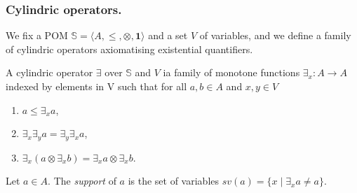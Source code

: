 \documentclass{llncs}
\newcommand{\comment}[1]{}
\def\monid{{\mathbf 0}}
\def\monop{\otimes}
\def\monid{\mathbf{1}}
\begin{document}
\comment{\smallskip
Our first step is the introduction of a technical notion that allows for 
factorising the common properties in the definition of the two families of operators.

\begin{definition}[pomonoid action]
\label{pomo}
Let $\mathbb{M} = \langle A, \leq, \monop, \monid \rangle$ be a partially ordered monoid and $\mathbb{P} = \langle S, \leq \rangle$ a partial order.
A pomonoid action of $\mathbb{M}$ on $\mathbb{P}$ is a function $\phi: A \times S \rightarrow S$ such that
	\begin{itemize}
	     \item $\forall s \in S.\ \phi(\monid, s) = s$,
         \item $\forall a, b \in A,\ s \in S.\ \phi(a, \phi(b, s)) = \phi(a \otimes b, s)$,
         \item $\forall a, b \in A,\ s, t \in S.\ a \leq b\, \wedge\, s \leq t \implies \phi(a, s) 
         \leq \phi (b, t)$.
	\end{itemize}
\end{definition}

The first two requirements just state
that $\phi$ is a monoid action of $\mathbb{M}$ on $S$, while the latter states that $\phi$ is monotone. Sometimes, we say that $\mathbb{P}$ is an $\mathbb{M}$-PO.}

\subsubsection{Cylindric operators.}
We fix a POM $\mathbb{S} = \langle A, \leq, \monop, \monid \rangle$
and a set $V$ of variables, and we define a family of cylindric operators axiomatising existential quantifiers.

\begin{definition}[Cylindrification]\label{cyli}
	A cylindric operator $\exists$ over $\mathbb{S}$ and $V$ ia family of monotone functions
	$\exists_x : A \rightarrow A$ indexed by elements in V such that for all 
	$a, b \in A$ and $x, y \in V$
	\begin{enumerate}
	     \item $a \leq \exists_x a$,
         \item $\exists_x \exists_y a = \exists_y \exists_x a$,
	     \item $\exists_x (a \monop \exists_x b) = \exists_x a \monop \exists_x b$.
	\end{enumerate}
	
	\noindent Let $a \in A$. The \emph{support} of $a$ is the set of variables 
	$sv(a) = \{ x \mid \exists_x a \neq a\}$. 
\end{definition}
\end{document}

